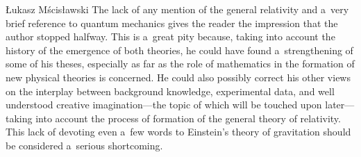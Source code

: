 \begin{newrevengenv}{Łukasz Mścisławski}
The lack of any mention of the general relativity and a~very brief reference to quantum mechanics gives the reader the impression that the author stopped halfway. This is a~great pity because, taking into account the history of the emergence of both theories, he could have found a~strengthening of some of his theses, especially as far as the role of mathematics in the formation of new physical theories is concerned. He could also possibly correct his other views on the interplay between background knowledge, experimental data, and well understood creative imagination---the topic of which will be touched upon later---taking into account the process of formation of the general theory of relativity. This lack of devoting even a~few words to Einstein's theory of gravitation should be considered a~serious shortcoming.


\end{newrevengenv}
